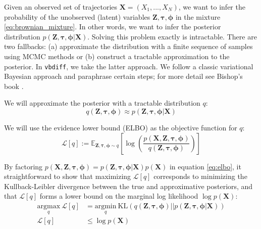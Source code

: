 \documentclass{article}
\let\vec\boldsymbol
\begin{document}
Given an observed set of trajectories $\vec{X} = (X_{1}, ..., X_{N})$, we
want to infer the probability of the unobserved (latent) variables
$\vec{Z}, \boldsymbol{\tau}, \boldsymbol{\phi}$ in the mixture \ref{eq:brownian_mixture}.
In other words, we want to infer the posterior distribution
$p \left( \vec{Z}, \boldsymbol{\tau}, \boldsymbol{\phi} | \vec{X} \right)$.
Solving this problem exactly is intractable. There are two fallbacks:
(a) approximate the distribution with a finite sequence of samples using
MCMC methods or (b) construct a tractable approximation to the posterior.
In \verb|vbdiff|, we take the latter approach. We follow
a classic variational Bayesian approach and paraphrase certain steps;
for more detail see Bishop's book \cite{bishop2006}. \newline

We will approximate the posterior with a tractable distribution $q$:
\[
    q \left( \vec{Z}, \boldsymbol{\tau}, \boldsymbol{\phi} \right) \approx p \left( \vec{Z}, \boldsymbol{\tau}, \boldsymbol{\phi} | \vec{X} \right)
\]

We will use the evidence lower bound (ELBO) as the objective function for $q$:
\begin{equation}\label{eq:elbo}
    \mathcal{L} \left[ q \right] := \mathbb{E}_{\vec{Z}, \boldsymbol{\tau}, \boldsymbol{\phi} \sim q} \left[
        \log \left(
            \frac{ p \left( \vec{X}, \vec{Z}, \boldsymbol{\tau}, \boldsymbol{\phi} \right)}{ q \left( \vec{Z}, \boldsymbol{\tau}, \boldsymbol{\phi} \right) }
        \right)
    \right]
\end{equation}

By factoring $p \left( \vec{X}, \vec{Z}, \boldsymbol{\tau}, \boldsymbol{\phi} \right) = p \left( \vec{Z}, \boldsymbol{\tau}, \boldsymbol{\phi} | \vec{X} \right) p \left( \vec{X} \right)$ in equation \ref{eq:elbo}, it straightforward to show that maximizing $\mathcal{L} [q]$ corresponds to minimizing the Kullback-Leibler divergence between the true and approximative posteriors, and that $\mathcal{L}[q]$ forms a lower bound on the marginal log likelihood $\log p (\vec{X})$:
\begin{align*}
    \underset{q}{\text{argmax}} \: \mathcal{L}[q] &= \underset{q}{\text{argmin}} \: \text{KL} \left( q(\vec{Z}, \boldsymbol{\tau}, \boldsymbol{\phi}) || p (\vec{Z}, \boldsymbol{\tau}, \boldsymbol{\phi} | \vec{X} ) \right) \\
    \mathcal{L}[q] &\leq \log p (\vec{X})
\end{align*}
\end{document}
